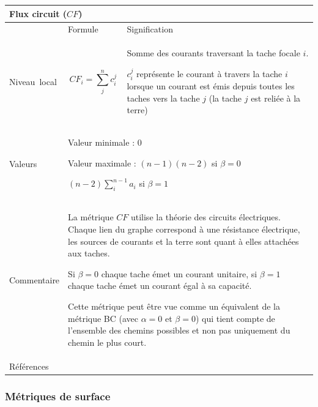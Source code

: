 \documentclass{article}
\begin{document}
\begin{table}[H]
	\begin{tabular}{|m{3.24cm}|m{4.4810004cm}m{7.924cm}|}
		\hline
		\multicolumn{3}{|m{16.044998cm}|}{Flux circuit ($CF$)}\\\hline
		&
		\multicolumn{1}{m{4.4810004cm}|}{Formule} &
		Signification\\\hline
		Niveau~local &
		\multicolumn{1}{m{4.4810004cm}|}{
			\begin{equation*}
			CF_{i}=\sum_{j}^n{c_i^j}
			\end{equation*}
		} &
		Somme des courants traversant la tache focale $i$.
		
		$c_i^j$ représente le courant à travers la tache $i$ lorsque un courant est émis depuis toutes les taches vers la tache $j$ (la tache $j$ est reliée à la terre)
		
		\\\hline
		Valeurs &
		\multicolumn{2}{m{12.6050005cm}|}{			
			Valeur minimale : 0
			
			Valeur maximale : $(n-1)(n-2)$ si $\beta=0$
			
			$(n-2)\sum_i^{n-1} a_i$ si $\beta=1$
			
		}\\\hline
		Commentaire &
		\multicolumn{2}{m{12.6050005cm}|}{
			La métrique $CF$ utilise la théorie des circuits électriques. Chaque lien du graphe correspond à une résistance électrique, les sources de courants et la terre sont quant à elles attachées aux taches.
			
			Si $\beta=0$ chaque tache émet un courant unitaire, si $\beta=1$ chaque tache émet un courant égal à sa capacité.
			
			Cette métrique peut être vue comme un équivalent de la métrique BC (avec $\alpha=0$ et $\beta=0$) qui tient compte de l'ensemble des chemins possibles et non pas uniquement du chemin le plus court.
			
		}\\\hline
		Références &
		\multicolumn{2}{m{12.6050005cm}|}{		
			\cite{2015_collisions}
		}\\\hline
	\end{tabular}
\end{table}


\subsubsection{Métriques de surface}
\end{document}
